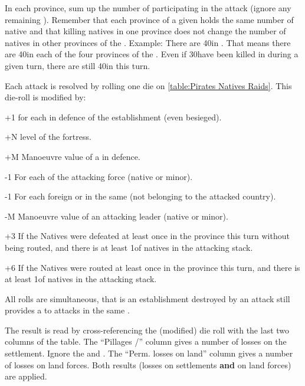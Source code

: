 \bparag In each province, sum up the number of \LD participating in the
attack (ignore any remaining \LDE).
\bparag Remember that each province of a given \Area holds the same number of
native \LD and that killing natives in one province does not change the number
of natives in other provinces of the \Area.
\bparag Example: There are 40\LD in \granderegionJapon. That means there are
40\LD in each of the four provinces of the \Area. Even if 30\LD have been
killed in \provinceEdo during a given turn, there are still 40\LD in
\provinceKyoto this turn.

\bparag Each attack is resolved by rolling one
die on \ref{table:Pirates
  Natives Raids}. This die-roll is modified by:
\begin{modlist}
\item[+1] for each \LD in defence of the establishment (even besieged).
\item[+N] level of the fortress.
\item[+M] Manoeuvre value of a  in defence.
\item[-1] For each \LD of the attacking force (native or \ROTW minor).
\item[-1] For each foreign \COL or \TP in the same \Area (not belonging to the
  attacked country).
\item[-M] Manoeuvre value of an attacking leader (native or \ROTW minor).
\item[+3] If the Natives were defeated at least once in the province this turn
  without being routed, and there is at least 1\LD of natives in the attacking
  stack.
\item[+6]If the Natives were routed at least once in the province this turn,
  and there is at least 1\LD of natives in the attacking stack.
\end{modlist}
\bparag All rolls are simultaneous, that is an establishment destroyed by an
attack still provides a  to attacks in the same \Area.

\bparag The result is read by cross-referencing the (modified) die roll with
the last two columns of the table.
\bparag The ``Pillages \TP/\COL'' column gives a number of losses on the
settlement. Ignore the \textddag\xspace and \textdag.
\bparag The ``Perm. losses on land'' column gives a number of losses on land
forces.
\bparag Both results (losses on settlements \textbf{and} on land forces) are
applied.

